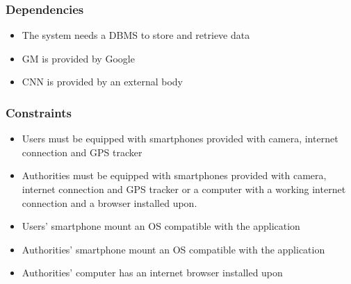 \subsubsection{Dependencies}

\begin{itemize}

\item The system needs a DBMS to store and retrieve data

\item GM is provided by Google

\item CNN is provided by an external body

\end{itemize}

\subsubsection{Constraints}

\begin{itemize}

\item Users must be equipped with smartphones provided with camera, internet connection and GPS tracker

\item Authorities must be equipped with smartphones provided with camera, internet connection and GPS tracker or a computer with a working internet connection and a browser installed upon.

\item Users' smartphone mount an OS compatible with the application

\item Authorities' smartphone mount an OS compatible with the application

\item Authorities' computer has an internet browser installed upon

\end{itemize}